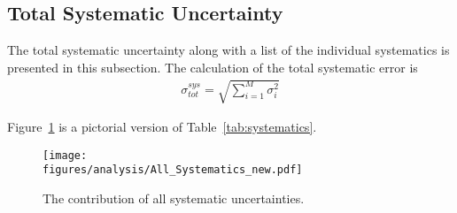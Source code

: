 \subsection{Total Systematic Uncertainty}
The total systematic uncertainty along with a list of the individual systematics is presented in this subsection. The calculation of the total systematic error is 
\begin{align}
\sigma^{sys}_{tot} = \sqrt{\sum_{i=1}^{M}\sigma_i^2}
\end{align}

Figure~\ref{fig:results.syserr} is a pictorial version of Table~\ref{tab:systematics}.
\begin{figure}[h!]\begin{center}
\texttt{[image: \\figures/analysis/All\_Systematics\_new.pdf]}
\caption[The contribution of all systematic uncertainties]{\label{fig:results.syserr}The contribution of all systematic uncertainties.}
\end{center}\end{figure}
\FloatBarrier
